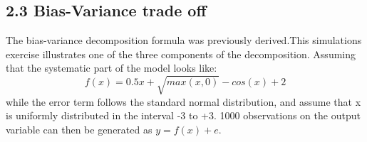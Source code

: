\documentclass{article}
\begin{document}
\subsection*{2.3 \space Bias-Variance trade off}
The bias-variance decomposition formula was previously derived.This simulations exercise illustrates one of the three components of the decomposition. Assuming that the systematic part of the model looks like:
\begin{equation}
    f(x) = 0.5x + \sqrt{max(x,0)} - cos(x) + 2
\end{equation}
while the error term follows the standard normal distribution, and assume that x is uniformly distributed in the interval -3 to +3. 1000 observations on the output variable can then be generated as $y = f(x) + e$.
\end{document}

